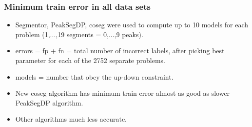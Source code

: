 \documentclass{beamer}
\begin{document}










\begin{frame}
  \frametitle{Minimum train error in all data sets}
  \begin{center}
      
  \end{center}
  \begin{itemize}
  \item Segmentor, PeakSegDP, coseg were used to compute up to 10
    models for each problem (1,...,19 segments = 0,...,9 peaks).
  \item errors = fp + fn = total number of incorrect labels, after
    picking best parameter for each of the 2752 separate problems.
  \item models = number that obey the up-down constraint.
  \item New coseg algorithm has minimum train error almost as good as
    slower PeakSegDP algorithm.
  \item Other algorithms much less accurate.
  \end{itemize}
\end{frame}
\end{document}
